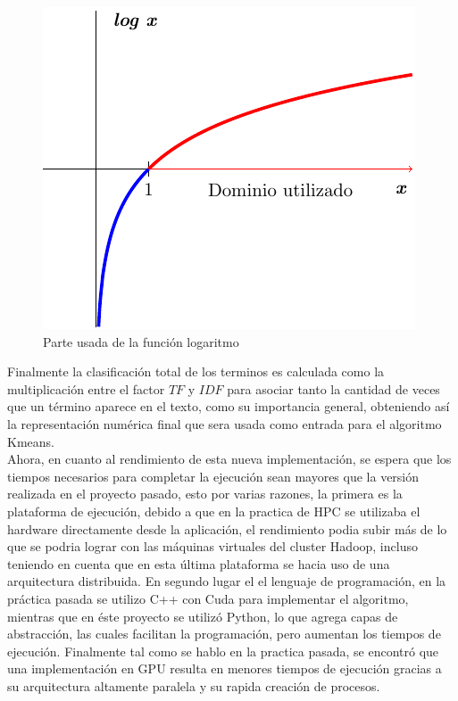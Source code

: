 \documentclass[conference,compsoc]{IEEEtran}
\begin{document}
\begin{figure}[H]
    \includegraphics[scale=1]{LogarithmPos.pdf}
    \caption{Parte usada de la función logaritmo}
    \label{fun:logpos}
\end{figure}

Finalmente la clasificación total de los terminos es calculada como la multiplicación entre el factor $TF$ y $IDF$ para asociar tanto la cantidad de veces que un término aparece en el texto, como su importancia general, obteniendo así la representación numérica final que sera usada como entrada para el algoritmo Kmeans.\\

Ahora, en cuanto al rendimiento de esta nueva implementación, se espera que
los tiempos necesarios para completar la ejecución sean mayores que la versión realizada en el proyecto pasado, esto por varias razones, la primera es la plataforma de ejecución, debido a que en la practica de HPC se utilizaba el hardware directamente desde la aplicación, el rendimiento podia subir más de lo que se podria lograr con las máquinas virtuales del cluster Hadoop, incluso teniendo en cuenta que en esta última plataforma se hacia uso de una arquitectura distribuida. En segundo lugar el el lenguaje de programación, en la práctica pasada se utilizo C++ con Cuda para implementar el algoritmo, mientras que en éste proyecto se utilizó Python, lo que agrega capas de abstracción, las cuales facilitan la programación, pero aumentan
los tiempos de ejecución. Finalmente tal como se hablo en la practica pasada,
se encontró que una implementación en GPU resulta en menores tiempos de ejecución gracias a su arquitectura altamente paralela y su rapida creación de procesos.\\
\end{document}
